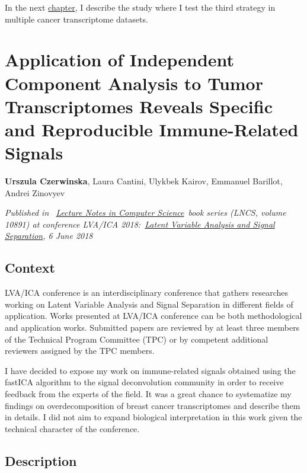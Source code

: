 \documentclass[12pt,]{book}
\theoremstyle{definition}
\theoremstyle{definition}
\theoremstyle{definition}
\theoremstyle{remark}
\begin{document}
In the next \protect\hyperlink{Lvaica}{chapter}, I describe the study
where I test the third strategy in multiple cancer transcriptome
datasets.



\hypertarget{lva}{%
\chapter{Application of Independent Component Analysis to Tumor
Transcriptomes Reveals Specific and Reproducible Immune-Related
Signals}\label{lva}}


\textbf{Urszula Czerwinska}, Laura Cantini, Ulykbek Kairov, Emmanuel
Barillot, Andrei Zinovyev

\emph{Published in
~\href{https://link.springer.com/bookseries/558}{Lecture Notes in
Computer Science}~book series (LNCS, volume 10891) at conference LVA/ICA
2018:~\href{https://link.springer.com/book/10.1007/978-3-319-93764-9}{Latent
Variable Analysis and Signal Separation}, 6 June 2018}

\hypertarget{context-1}{%
\section{Context}\label{context-1}}

LVA/ICA conference is an interdisciplinary conference that gathers
researches working on Latent Variable Analysis and Signal Separation in
different fields of application. Works presented at LVA/ICA conference
can be both methodological and application works. Submitted papers are
reviewed by at least three members of the Technical Program Committee
(TPC) or by competent additional reviewers assigned by the TPC members.

I have decided to expose my work on immune-related signals obtained
using the fastICA algorithm to the signal deconvolution community in
order to receive feedback from the experts of the field. It was a great
chance to systematize my findings on overdecomposition of breast cancer
transcriptomes and describe them in details. I did not aim to expand
biological interpretation in this work given the technical character of
the conference.

\hypertarget{description-1}{%
\section{Description}\label{description-1}}
\end{document}
